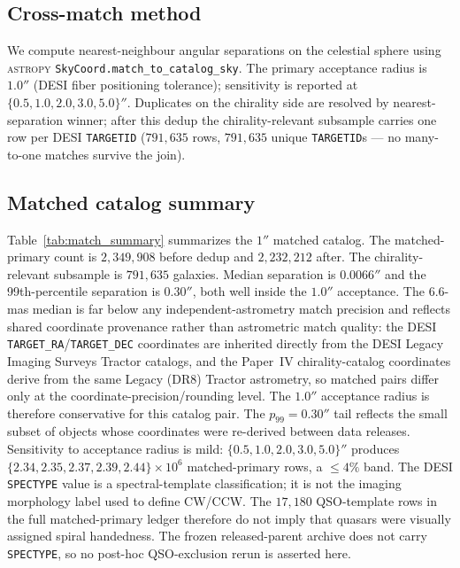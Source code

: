 \documentclass[twocolumn,linenumbers]{aastex702}
\begin{document}
\subsection{Cross-match method}

We compute nearest-neighbour angular separations on the celestial sphere
using \textsc{astropy} \texttt{SkyCoord.match\_to\_catalog\_sky}. The
primary acceptance radius is $1.0''$ (DESI fiber positioning tolerance);
sensitivity is reported at $\{0.5, 1.0, 2.0, 3.0, 5.0\}''$. Duplicates
on the chirality side are resolved by nearest-separation winner; after
this dedup the chirality-relevant subsample carries one row per DESI
\texttt{TARGETID} ($791{,}635$ rows, $791{,}635$ unique
\texttt{TARGETID}s — no many-to-one matches survive the join).

\subsection{Matched catalog summary}\label{sec:matched_summary}

Table~\ref{tab:match_summary} summarizes the $1''$ matched catalog.
The matched-primary count is $2{,}349{,}908$ before dedup and
$2{,}232{,}212$ after. The chirality-relevant subsample is $791{,}635$
galaxies. Median separation is $0.0066''$ and the 99th-percentile
separation is $0.30''$, both well inside the $1.0''$ acceptance.
The 6.6-mas median is far below any independent-astrometry match
precision and reflects shared coordinate provenance rather than
astrometric match quality: the DESI \texttt{TARGET\_RA}/\texttt{TARGET\_DEC}
coordinates are inherited directly from the DESI Legacy Imaging Surveys
Tractor catalogs, and the Paper~IV chirality-catalog coordinates derive
from the same Legacy (DR8) Tractor astrometry, so matched pairs differ
only at the coordinate-precision/rounding level. The $1.0''$ acceptance
radius is therefore conservative for this catalog pair. The
$p_{99} = 0.30''$ tail reflects the small subset of objects whose
coordinates were re-derived between data releases.
Sensitivity to acceptance radius is mild: $\{0.5, 1.0, 2.0, 3.0,
5.0\}''$ produces $\{2.34, 2.35, 2.37, 2.39, 2.44\}\!\times\!10^6$
matched-primary rows, a $\le 4\%$ band.
The DESI \texttt{SPECTYPE} value is a spectral-template classification;
it is not the imaging morphology label used to define CW/CCW. The
$17{,}180$ QSO-template rows in the full matched-primary ledger therefore
do not imply that quasars were visually assigned spiral handedness. The
frozen released-parent archive does not carry \texttt{SPECTYPE},
so no post-hoc QSO-exclusion rerun is asserted here.
\end{document}
